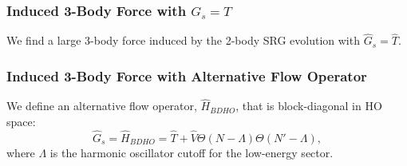 \documentclass{beamer}
\begin{document}
{\begin{frame}
\end{frame}

\begin{frame}
\frametitle{Induced 3-Body Force with $G_s=T$}
We find a large 3-body force induced by the 2-body SRG evolution with $\hat{G}_s=\hat{T}$.

\begin{figure}
\begin{center}
\end{center}
\label{fig:heinz_vfull}
\end{figure}
\end{frame}

\begin{frame}
\frametitle{Induced 3-Body Force with Alternative Flow Operator}
We define an alternative flow operator, $\hat{H}_{BDHO}$, that is block-diagonal in HO space:
\begin{equation}
\hat{G}_s = \hat{H}_{BDHO} = \hat{T} + \hat{V} \Theta(N - \Lambda) \Theta(N' - \Lambda),
\end{equation}
where $\Lambda$ is the harmonic oscillator cutoff for the low-energy sector.


\end{frame}}
\end{document}
